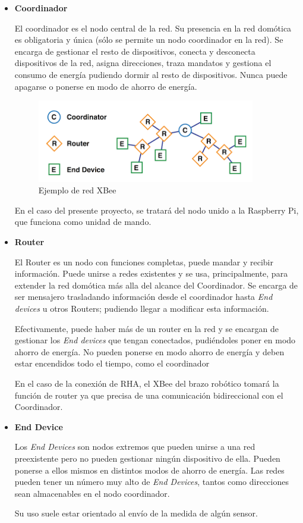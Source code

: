 \begin{itemize}
\item \textbf{Coordinador}

El coordinador es el nodo central de la red. Su presencia en la red domótica es obligatoria y única (sólo se permite un nodo coordinador en la red). Se encarga de gestionar el resto de dispositivos, conecta y desconecta dispositivos de la red, asigna direcciones, traza mandatos y gestiona el consumo de energía pudiendo dormir al resto de dispositivos. Nunca puede apagarse o ponerse en modo de ahorro de energía.

\begin{figure}[H]
\centering
\includegraphics[width=0.9\textwidth]{figuras/XbeeRed.png}
\caption{Ejemplo de red XBee}
\label{fig:XbeeRed}
\end{figure}

En el caso del presente proyecto, se tratará del nodo unido a la Raspberry Pi, que funciona como unidad de mando.

\item \textbf{Router}

El Router es un nodo con funciones completas, puede mandar y recibir información. Puede unirse a redes existentes y se usa, principalmente, para extender la red domótica más alla del alcance del Coordinador. Se encarga de ser mensajero trasladando información desde el coordinador hasta \textit{End devices} u otros Routers; pudiendo llegar a modificar esta información.

Efectivamente, puede haber más de un router en la red y se encargan de gestionar los \textit{End devices} que tengan conectados, pudiéndoles poner en modo ahorro de energía. No pueden ponerse en modo ahorro de energía y deben estar encendidos todo el tiempo, como el coordinador

En el caso de la conexión de RHA, el XBee del brazo robótico tomará la función de router ya que precisa de una comunicación bidireccional con el Coordinador.

\item \textbf{End Device}

Los \textit{End Devices} son nodos extremos que pueden unirse a una red preexistente pero no pueden gestionar ningún dispositivo de ella. Pueden ponerse a ellos mismos en distintos modos de ahorro de energía. Las redes pueden tener un número muy alto de \textit{End Devices}, tantos como direcciones sean almacenables en el nodo coordinador.

Su uso suele estar orientado al envío de la medida de algún sensor.

\end{itemize}



